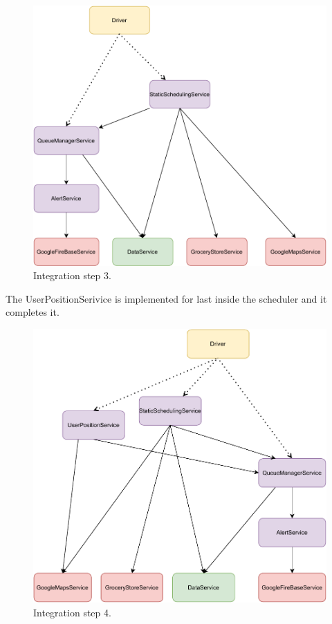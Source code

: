 \begin{figure}[H]
    \centering
    \includegraphics[width=1.0\textwidth]{images/component3.pdf}
    \caption{Integration step 3.}
\end{figure}
The UserPositionSerivice is implemented for last inside the scheduler and it completes it.
\begin{figure}[H]
    \centering
    \includegraphics[width=1.0\textwidth]{images/component4.pdf}
    \caption{Integration step 4.}
\end{figure}
